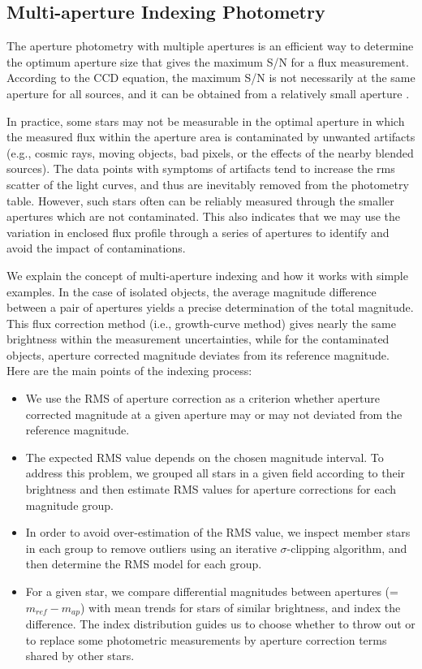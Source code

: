 \subsection{Multi-aperture Indexing Photometry}
The aperture photometry with multiple apertures is an efficient way to determine the optimum aperture size that gives the maximum S/N for a flux measurement.  According to the CCD equation, the maximum S/N is not necessarily at the same aperture for all sources, and it can be obtained from a relatively small aperture \citep{how89}.

In practice, some stars may not be measurable in the optimal aperture in which the measured flux within the aperture area is contaminated by unwanted artifacts (e.g., cosmic rays, moving objects, bad pixels, or the effects of the nearby blended sources).  The data points with symptoms of artifacts tend to increase the rms scatter of the light curves, and thus are inevitably removed from the photometry table.  However, such stars often can be reliably measured through the smaller apertures which are not contaminated.  This also indicates that we may use the variation in enclosed flux profile through a series of apertures to identify and avoid the impact of contaminations.

We explain the concept of multi-aperture indexing and how it works with simple examples.  In the case of isolated objects, the average magnitude difference between a pair of apertures yields a precise determination of the total magnitude.  This flux correction method (i.e., growth-curve method) gives nearly the same brightness within the measurement uncertainties, while for the contaminated objects, aperture corrected magnitude deviates from its reference magnitude.    Here are the main points of the indexing process: \begin{itemize}
\item{We use the RMS of aperture correction as a criterion whether aperture corrected magnitude at a given aperture may or may not deviated from the reference magnitude.}

\item{The expected RMS value depends on the chosen magnitude interval.  To address this problem, we grouped all stars in a given field according to their brightness and then estimate RMS values for aperture corrections for each magnitude group.}

\item{In order to avoid over-estimation of the RMS value, we inspect member stars in each group to remove outliers using an iterative $\sigma$-clipping algorithm, and then determine the RMS model for each group.}

\item{For a given star, we compare differential magnitudes between apertures (=$m_{ref}-m_{ap}$) with mean trends for stars of similar brightness, and index the difference.  The index distribution guides us to choose whether to throw out or to replace some photometric measurements by aperture correction terms shared by other stars.}
\end{itemize}

